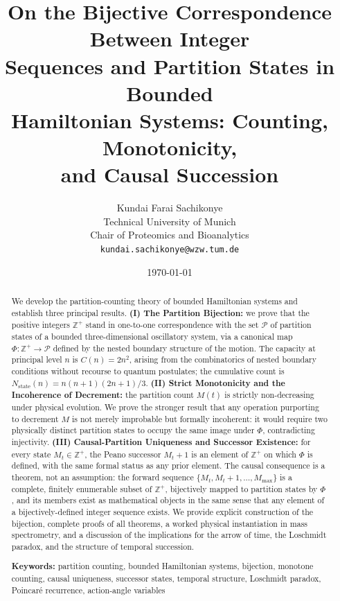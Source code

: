 \documentclass[twocolumn,10pt,a4paper]{article}
\title{\textbf{On the Bijective Correspondence Between Integer\\
Sequences and Partition States in Bounded\\
Hamiltonian Systems: Counting, Monotonicity,\\
and Causal Succession}}
\author{
Kundai Farai Sachikonye \\
Technical University of Munich \\
Chair of Proteomics and Bioanalytics \\
\texttt{kundai.sachikonye@wzw.tum.de}
}
\date{\today}
\theoremstyle{thmstyle}
\theoremstyle{definition}
\theoremstyle{remark}
\newcommand{\Zp}{\mathbb{Z}^{+}}
\newcommand{\Parts}{\mathcal{P}}
\newcommand{\Nstate}{N_{\mathrm{state}}}
\newcommand{\Mmax}{M_{\max}}
\newcommand{\PhiMap}{\varPhi}
\begin{document}
\maketitle

\begin{abstract}
\noindent
We develop the partition-counting theory of bounded Hamiltonian systems and establish three principal results. \textbf{(I) The Partition Bijection:} we prove that the positive integers $\Zp$ stand in one-to-one correspondence with the set $\Parts$ of partition states of a bounded three-dimensional oscillatory system, via a canonical map $\PhiMap : \Zp \to \Parts$ defined by the nested boundary structure of the motion. The capacity at principal level $n$ is $C(n) = 2n^2$, arising from the combinatorics of nested boundary conditions without recourse to quantum postulates; the cumulative count is $\Nstate(n) = n(n+1)(2n+1)/3$. \textbf{(II) Strict Monotonicity and the Incoherence of Decrement:} the partition count $M(t)$ is strictly non-decreasing under physical evolution. We prove the stronger result that any operation purporting to decrement $M$ is not merely improbable but formally incoherent: it would require two physically distinct partition states to occupy the same image under $\PhiMap$, contradicting injectivity. \textbf{(III) Causal-Partition Uniqueness and Successor Existence:} for every state $M_t \in \Zp$, the Peano successor $M_t + 1$ is an element of $\Zp$ on which $\PhiMap$ is defined, with the same formal status as any prior element. The causal consequence is a theorem, not an assumption: the forward sequence $\{M_t, M_t+1, \ldots, \Mmax\}$ is a complete, finitely enumerable subset of $\Zp$, bijectively mapped to partition states by $\PhiMap$, and its members exist as mathematical objects in the same sense that any element of a bijectively-defined integer sequence exists. We provide explicit construction of the bijection, complete proofs of all theorems, a worked physical instantiation in mass spectrometry, and a discussion of the implications for the arrow of time, the Loschmidt paradox, and the structure of temporal succession.

\bigskip
\noindent\textbf{Keywords:} partition counting, bounded Hamiltonian systems, bijection, monotone counting, causal uniqueness, successor states, temporal structure, Loschmidt paradox, Poincar\'e recurrence, action-angle variables
\end{abstract}

\tableofcontents
\end{document}
